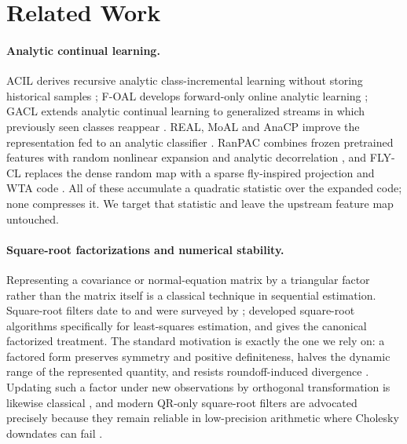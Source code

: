 \documentclass{article}
\begin{document}
\section{Related Work}
\label{sec:related}

\paragraph{Analytic continual learning.}
ACIL derives recursive analytic class-incremental learning without storing
historical samples \citep{zhuang2022acil}; F-OAL develops forward-only online
analytic learning \citep{zhuang2024foal}; GACL extends analytic continual
learning to generalized streams in which previously seen classes reappear
\citep{zhuang2024gacl}. REAL, MoAL and AnaCP improve the representation fed to
an analytic classifier \citep{he2024real,gao2025moal,momeni2025anacp}. RanPAC
combines frozen pretrained features with random nonlinear expansion and
analytic decorrelation \citep{mcdonnell2023ranpac}, and FLY-CL replaces the
dense random map with a sparse fly-inspired projection and WTA code
\citep{zou2026flycl}. All of these accumulate a quadratic statistic over the
expanded code; none compresses it. We target that statistic and leave the
upstream feature map untouched.

\paragraph{Square-root factorizations and numerical stability.}
Representing a covariance or normal-equation matrix by a triangular factor
rather than the matrix itself is a classical technique in sequential
estimation. Square-root filters date to \citet{potter1963} and were surveyed by
\citet{kaminski1971}; \citet{morf1975} developed square-root algorithms
specifically for least-squares estimation, and \citet{bierman1977} gives the
canonical factorized treatment. The standard motivation is exactly the one we
rely on: a factored form preserves symmetry and positive definiteness, halves
the dynamic range of the represented quantity, and resists roundoff-induced
divergence \citep{kailath2000}. Updating such a factor under new observations
by orthogonal transformation is likewise classical
\citep{gill1974,golub2013,bjorck1996}, and modern QR-only square-root filters
are advocated precisely because they remain reliable in low-precision
arithmetic where Cholesky downdates can fail \citep{tracy2022qrsqrt,tronarp2024}.
\end{document}
